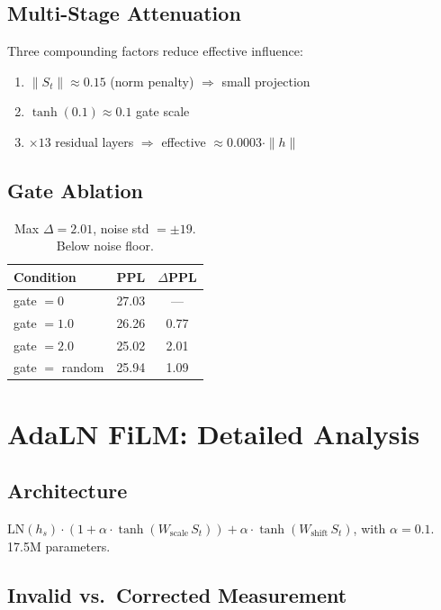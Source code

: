 \documentclass[11pt,a4paper]{article}
\newcommand{\St}{S_t}
\begin{document}
\subsection*{Multi-Stage Attenuation}

Three compounding factors reduce effective influence:
\begin{enumerate}
  \item $\|S_t\| \approx 0.15$ (norm penalty) $\Rightarrow$ small projection
  \item $\tanh(0.1) \approx 0.1$ gate scale
  \item $\times 13$ residual layers $\Rightarrow$ effective $\approx 0.0003 \cdot \|h\|$
\end{enumerate}

\subsection*{Gate Ablation}

\begin{table}[h]
\centering
\begin{tabular}{lcc}
\toprule
\textbf{Condition} & \textbf{PPL} & $\Delta$\textbf{PPL} \\
\midrule
gate $= 0$      & 27.03 & ---  \\
gate $= 1.0$    & 26.26 & 0.77 \\
gate $= 2.0$    & 25.02 & 2.01 \\
gate $=$ random & 25.94 & 1.09 \\
\bottomrule
\end{tabular}
\caption{Max $\Delta = 2.01$, noise std $= \pm 19$. Below noise floor.}
\end{table}

\section{AdaLN FiLM: Detailed Analysis}
\label{app:adaln}

\subsection*{Architecture}

$\mathrm{LN}(h_s) \cdot (1 + \alpha\cdot\tanh(W_\mathrm{scale}\,\St)) +
\alpha\cdot\tanh(W_\mathrm{shift}\,\St)$, with $\alpha = 0.1$. 17.5M parameters.

\subsection*{Invalid vs.\ Corrected Measurement}
\end{document}
